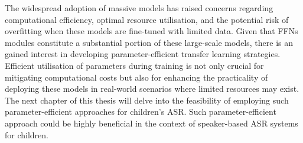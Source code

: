 The widespread adoption of massive models has raised concerns regarding computational efficiency, optimal resource utilisation, and the potential risk of overfitting when these models are fine-tuned with limited data. Given that FFNs modules constitute a substantial portion of these large-scale models, there is an gained interest in developing parameter-efficient transfer learning strategies. Efficient utilisation of parameters during training is not only crucial for mitigating computational costs but also for enhancing the practicality of deploying these models in real-world scenarios where limited resources may exist.
The next chapter of this thesis will delve into the feasibility of employing such parameter-efficient approaches for children's ASR. Such parameter-efficient approach could be highly beneficial in the context of speaker-based ASR systems for children. 


